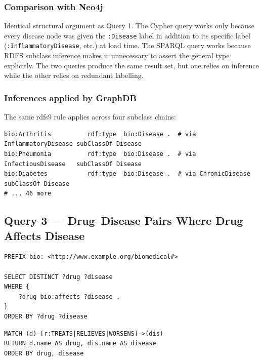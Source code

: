 \documentclass[11pt,a4paper]{article}
\begin{document}
\subsubsection*{Comparison with Neo4j}

Identical structural argument as Query 1.  The Cypher query works only because
every disease node was given the \texttt{:Disease} label in addition to its
specific label (\texttt{:InflammatoryDisease}, etc.) at load time.  The SPARQL
query works because RDFS subclass inference makes it unnecessary to assert the
general type explicitly.  The two queries produce the same result set, but
one relies on inference while the other relies on redundant labelling.

\subsubsection*{Inferences applied by GraphDB}

The same rdfs9 rule applies across four subclass chains:

\begin{lstlisting}[style=turtle]
bio:Arthritis          rdf:type  bio:Disease .  # via InflammatoryDisease subClassOf Disease
bio:Pneumonia          rdf:type  bio:Disease .  # via InfectiousDisease   subClassOf Disease
bio:Diabetes           rdf:type  bio:Disease .  # via ChronicDisease      subClassOf Disease
# ... 46 more
\end{lstlisting}


\subsection{Query 3 — Drug–Disease Pairs Where Drug Affects Disease}

\begin{lstlisting}[style=sparql, caption={SPARQL: all drug--disease interaction pairs.}]
PREFIX bio: <http://www.example.org/biomedical#>

SELECT DISTINCT ?drug ?disease
WHERE {
    ?drug bio:affects ?disease .
}
ORDER BY ?drug ?disease
\end{lstlisting}

\begin{lstlisting}[style=cypher, caption={Cypher equivalent: all drug--disease interactions.}]
MATCH (d)-[r:TREATS|RELIEVES|WORSENS]->(dis)
RETURN d.name AS drug, dis.name AS disease
ORDER BY drug, disease
\end{lstlisting}
\end{document}
